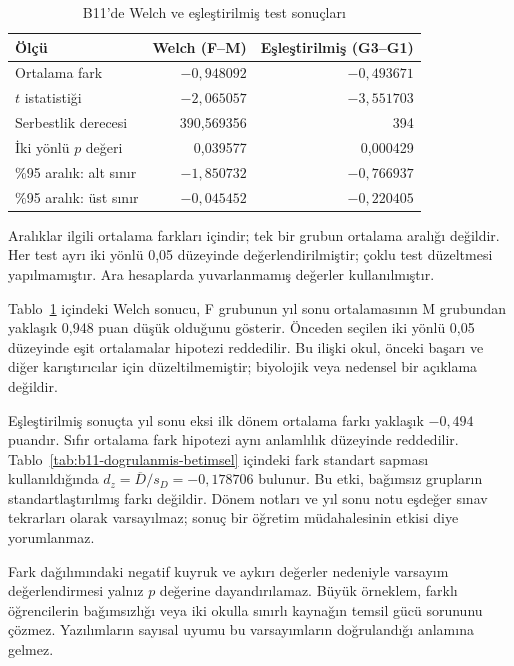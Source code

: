 \begin{table}[H]
\centering
\caption{B11'de Welch ve eşleştirilmiş test sonuçları}
\label{tab:b11-dogrulanmis-test}
\begin{tabular}{@{}lrr@{}}
\toprule
Ölçü & Welch (F--M) & Eşleştirilmiş (G3--G1) \\
\midrule
Ortalama fark & $-0{,}948092$ & $-0{,}493671$ \\
$t$ istatistiği & $-2{,}065057$ & $-3{,}551703$ \\
Serbestlik derecesi & 390,569356 & 394 \\
İki yönlü $p$ değeri & 0,039577 & 0,000429 \\
\%95 aralık: alt sınır & $-1{,}850732$ & $-0{,}766937$ \\
\%95 aralık: üst sınır & $-0{,}045452$ & $-0{,}220405$ \\
\bottomrule
\end{tabular}
\par\smallskip
{\footnotesize Aralıklar ilgili ortalama farkları içindir; tek bir
grubun ortalama aralığı değildir. Her test ayrı iki yönlü 0,05
düzeyinde değerlendirilmiştir; çoklu test düzeltmesi yapılmamıştır.
Ara hesaplarda yuvarlanmamış değerler kullanılmıştır.\par}
\end{table}

\begin{outputguidebox}
Tablo~\ref{tab:b11-dogrulanmis-test} içindeki Welch sonucu,
F grubunun yıl sonu ortalamasının M grubundan yaklaşık 0,948 puan
düşük olduğunu gösterir. Önceden seçilen iki yönlü 0,05 düzeyinde
eşit ortalamalar hipotezi reddedilir. Bu ilişki okul, önceki başarı
ve diğer karıştırıcılar için düzeltilmemiştir; biyolojik veya
nedensel bir açıklama değildir.

Eşleştirilmiş sonuçta yıl sonu eksi ilk dönem ortalama farkı yaklaşık
$-0{,}494$ puandır. Sıfır ortalama fark hipotezi aynı anlamlılık
düzeyinde reddedilir. Tablo~\ref{tab:b11-dogrulanmis-betimsel}
içindeki fark standart sapması kullanıldığında
$d_z=\overline{D}/s_D=-0{,}178706$ bulunur. Bu etki, bağımsız
grupların standartlaştırılmış farkı değildir. Dönem notları ve yıl
sonu notu eşdeğer sınav tekrarları olarak varsayılmaz; sonuç bir
öğretim müdahalesinin etkisi diye yorumlanmaz.

Fark dağılımındaki negatif kuyruk ve aykırı değerler nedeniyle
varsayım değerlendirmesi yalnız $p$ değerine dayandırılamaz.
Büyük örneklem, farklı öğrencilerin bağımsızlığı veya iki okulla
sınırlı kaynağın temsil gücü sorununu çözmez. Yazılımların sayısal
uyumu bu varsayımların doğrulandığı anlamına gelmez.
\end{outputguidebox}

